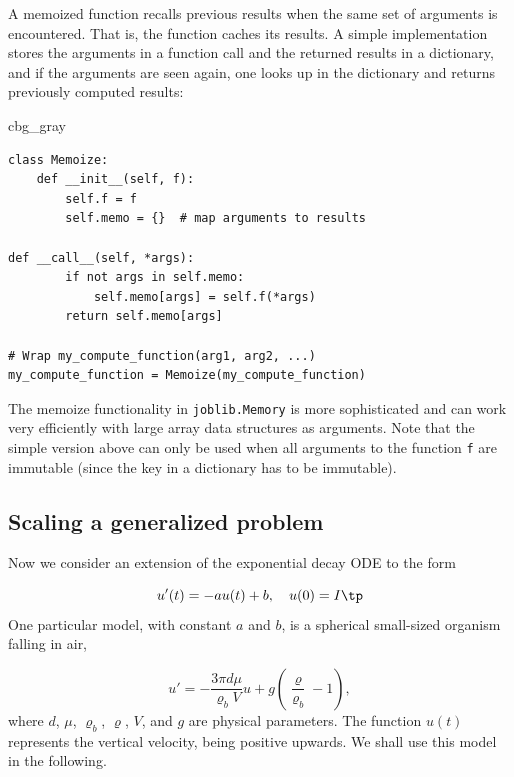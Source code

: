 \documentclass[graybox,envcountchap,sectrefs,final]{svmonodo}
\newenvironment{_cod_tight}[1]{
   \def\FrameCommand{\colorbox{#1}}
   \FrameRule0.6pt\MakeFramed {\FrameRestore}\vskip3mm}
   {\vskip0mm\endMakeFramed}
\newenvironment{cod}[1]{
\bgroup\rmfamily
\fboxsep=0mm\relax
\begin{_cod_tight}{#1}
\list{}{\parsep=-2mm\parskip=0mm\topsep=0pt\leftmargin=2mm
\rightmargin=2\leftmargin\leftmargin=4pt\relax}
\item\relax}
{\endlist\end{_cod_tight}\egroup}
\newenvironment{notice_mdfboxadmon}[1][]{
\begin{notice_mdfboxmdframed}[frametitle=#1]
}
{
\end{notice_mdfboxmdframed}
}
\begin{document}
\begin{notice_mdfboxadmon}
A memoized function recalls
previous results when the same set
of arguments is encountered. That is, the function caches its results.
A simple implementation stores the arguments in a function call and
the returned results in a
dictionary, and if the arguments are seen again, one looks up
in the dictionary and returns previously computed results:

\begin{cod}{cbg_gray}\begin{Verbatim}[numbers=none,fontsize=\fontsize{9pt}{9pt},baselinestretch=0.95,xleftmargin=2mm]
class Memoize:
    def __init__(self, f):
        self.f = f
        self.memo = {}  # map arguments to results

def __call__(self, *args):
        if not args in self.memo:
            self.memo[args] = self.f(*args)
        return self.memo[args]

# Wrap my_compute_function(arg1, arg2, ...)
my_compute_function = Memoize(my_compute_function)
\end{Verbatim}
\end{cod}
\noindent
The memoize functionality in \texttt{joblib.Memory} is more sophisticated and
can work very efficiently with large array data structures as arguments.
Note that the simple version above can only be used when all arguments to
the function \texttt{f} are immutable (since the key in a dictionary has to be
immutable).
\end{notice_mdfboxadmon}



\subsection{Scaling a generalized problem}
\label{sec:scale:body}

Now we consider an extension of the exponential decay ODE to the
form

\begin{equation}
u'(t) = -au(t) + b,\quad u(0)=I
\label{scale:model:g}
\tp
\end{equation}
One particular model, with constant $a$ and $b$,
is a spherical small-sized organism falling in air,

\begin{equation}
u' = - \frac{3\pi d\mu}{\varrho_b V} u + g\left(\frac{\varrho}{\varrho_b} -1\right),
\label{scale:model:g:spec}
\end{equation}
where $d$, $\mu$, $\varrho_b$, $\varrho$, $V$, and $g$ are physical
parameters. The function $u(t)$ represents the vertical velocity,
being positive upwards.
We shall use this model in the following.
\end{document}
